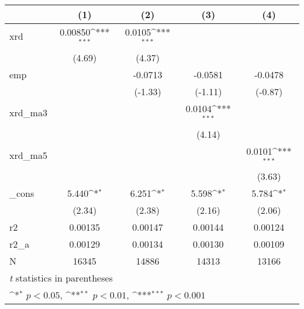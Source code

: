{
\def\sym#1{\ifmmode^{#1}\else\(^{#1}\)\fi}
\begin{tabular}{l*{4}{c}}
\hline\hline
            &\multicolumn{1}{c}{(1)}         &\multicolumn{1}{c}{(2)}         &\multicolumn{1}{c}{(3)}         &\multicolumn{1}{c}{(4)}         \\
\hline
xrd         &     0.00850\sym{***}&      0.0105\sym{***}&                     &                     \\
            &      (4.69)         &      (4.37)         &                     &                     \\
[1em]
emp         &                     &     -0.0713         &     -0.0581         &     -0.0478         \\
            &                     &     (-1.33)         &     (-1.11)         &     (-0.87)         \\
[1em]
xrd\_ma3     &                     &                     &      0.0104\sym{***}&                     \\
            &                     &                     &      (4.14)         &                     \\
[1em]
xrd\_ma5     &                     &                     &                     &      0.0101\sym{***}\\
            &                     &                     &                     &      (3.63)         \\
[1em]
\_cons      &       5.440\sym{*}  &       6.251\sym{*}  &       5.598\sym{*}  &       5.784\sym{*}  \\
            &      (2.34)         &      (2.38)         &      (2.16)         &      (2.06)         \\
\hline
r2          &     0.00135         &     0.00147         &     0.00144         &     0.00124         \\
r2\_a        &     0.00129         &     0.00134         &     0.00130         &     0.00109         \\
N           &       16345         &       14886         &       14313         &       13166         \\
\hline\hline
\multicolumn{5}{l}{\footnotesize \textit{t} statistics in parentheses}\\
\multicolumn{5}{l}{\footnotesize \sym{*} \(p<0.05\), \sym{**} \(p<0.01\), \sym{***} \(p<0.001\)}\\
\end{tabular}
}
